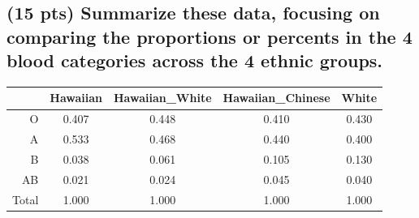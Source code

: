 \documentclass{article}\usepackage[]{graphicx}\usepackage[]{color}
\begin{document}
\subsection{(15 pts) Summarize these data, focusing on comparing the proportions or percents in the 4 blood categories across the 4 ethnic groups.}

\begin{table}[ht]
\centering
\begin{tabular}{r|cccc}
  \hline
 & Hawaiian & Hawaiian\_White & Hawaiian\_Chinese & White \\ 
  \hline
O & 0.407 & 0.448 & 0.410 & 0.430 \\ 
  A & 0.533 & 0.468 & 0.440 & 0.400 \\ 
  B & 0.038 & 0.061 & 0.105 & 0.130 \\ 
  AB & 0.021 & 0.024 & 0.045 & 0.040 \\ 
   \hline
Total & 1.000 & 1.000 & 1.000 & 1.000 \\ 
   \hline
\end{tabular}
\end{table}
\end{document}
